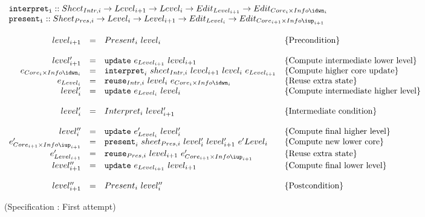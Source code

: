 \begin{small}
 \label{spec:compositionFirstAttempt}
\( \begin{array}{lcl}
{\tt interpret_i}  ::  Sheet_{Intr,i} \rightarrow Level_{i+1} \rightarrow Level_{i} \rightarrow  Edit_{Level_{i+1}} \rightarrow Edit_{Core_{i}\times Info\idwn_{i}} \\
{\tt present_i}  ::  Sheet_{Pres,i} \rightarrow Level_{i} \rightarrow Level_{i+1}  \rightarrow Edit_{Level_{i}} \rightarrow Edit_{Core_{i+1}\times Info\iup_{i+1}}\\
\\
\end{array}\) \\
\( \begin{array}{rcll}  
level_{i+1} 	& = & Present_{i}~level_{i}						& \text{\{Precondition\}}\\
\\
level'_{i+1} 	& = & {\tt update}~e_{Level_{i+1}}~level_{i+1}                 & \text{\{Compute intermediate lower level\}}\\
e_{Core_{i} \times Info\idwn_{i}}  & = & {\tt interpret}_{i}~sheet_{Intr,i}~level_{i+1}~level_{i}~e_{Level_{i+1}} & \text{\{Compute higher core update\}}\\
e_{Level_{i}} & = & {\tt reuse}_{Intr,i}~level_{i}~e_{Core_{i}\times Info\idwn_{i}}     & \text{\{Reuse extra state\}}\\
level'_{i} & = & {\tt update}~e_{Level_{i}}~level_{i}                 & \text{\{Compute intermediate higher level\}}\\
\\\
level'_{i} & = & Interpret_{i}~level'_{i+1}						& \text{\{Intermediate condition\}}\\
\\
level''_{i} & = & {\tt update}~e'_{Level_{i}}~level'_{i}                 & \text{\{Compute final higher level\}}\\
e'_{Core_{i+1}\times Info\iup_{i+1}}  & = & {\tt present}_{i}~sheet_{Pres,i}~level'_{i}~level'_{i+1}~e'{Level_{i}} & \text{\{Compute new lower core\}}\\
e'_{Level_{i+1}} & = & {\tt reuse}_{Pres,i}~level_{i+1}~e'_{Core_{i+1}\times Info\iup_{i+1}} & \text{\{Reuse extra state\}}\\
level''_{i+1} & = & {\tt update}~e_{Level_{i+1}}~level_{i+1}                 & \text{\{Compute final lower level\}}\\
\\
level''_{i+1} & = & Present_{i}~level''_{i}						& \text{\{Postcondition\}}\\
\end{array}\)
\end{small}
\begin{center}(Specification \thespecification: First attempt)\end{center}\vspace{1em}

